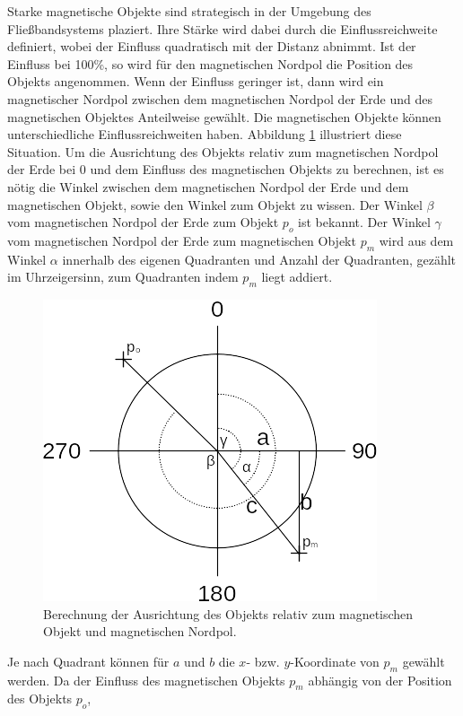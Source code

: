 \newline
Starke magnetische Objekte sind strategisch in der Umgebung des Fließbandsystems plaziert.
Ihre Stärke wird dabei durch die Einflussreichweite definiert, wobei der Einfluss quadratisch mit der Distanz abnimmt.
Ist der Einfluss bei 100\%, so wird für den magnetischen Nordpol die Position des Objekts angenommen.
Wenn der Einfluss geringer ist, dann wird ein magnetischer Nordpol zwischen dem magnetischen Nordpol der Erde und des magnetischen Objektes Anteilweise gewählt.
Die magnetischen Objekte können unterschiedliche Einflussreichweiten haben.
\newline
\newline
Abbildung \ref{fig:magnetic_model} illustriert diese Situation.
Um die Ausrichtung des Objekts relativ zum magnetischen Nordpol der Erde bei 0 und dem Einfluss des magnetischen Objekts zu berechnen,
ist es nötig die Winkel zwischen dem magnetischen Nordpol der Erde und dem magnetischen Objekt, sowie den Winkel zum Objekt zu wissen.
Der Winkel $\beta$ vom magnetischen Nordpol der Erde zum Objekt $p_{o}$ ist bekannt.
Der Winkel $\gamma$ vom magnetischen Nordpol der Erde zum magnetischen Objekt $p_{m}$ wird aus dem Winkel $\alpha$ innerhalb des eigenen Quadranten
und Anzahl der Quadranten, gezählt im Uhrzeigersinn, zum Quadranten indem $p_{m}$ liegt addiert.
\begin{figure}[h!]
    \centering
    \includegraphics[width=0.7\linewidth]{images/magnetic_model.png}
    \caption{Berechnung der Ausrichtung des Objekts relativ zum magnetischen Objekt und magnetischen Nordpol.}
    \label{fig:magnetic_model}
\end{figure}
Je nach Quadrant können für $a$ und $b$ die $x$- bzw. $y$-Koordinate von $p_{m}$ gewählt werden.
Da der Einfluss des magnetischen Objekts $p_{m}$ abhängig von der Position des Objekts $p_{o}$,
